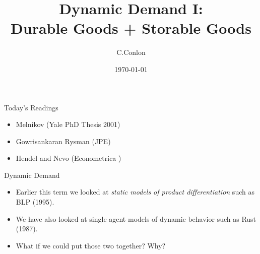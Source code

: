 \def\beamerclassoptions{[xcolor=pdftex,dvipsnames,table,mathserif,aspectratio=169]}


\usepackage[english]{babel}
\usepackage{pgf,pgfarrows,pgfnodes,pgfautomata,pgfheaps}
\usepackage{amsmath,amssymb,setspace,centernot}
\usepackage[latin1]{inputenc}
\usepackage[T1]{fontenc}
\usepackage{relsize}
\usepackage{pdfpages}
\usepackage[absolute,overlay]{textpos} 



\title [Dynamic Demand I]{Dynamic Demand I:\\
 Durable Goods + Storable Goods}
\author{C.Conlon}
\date{\today}


\begin{frame}
\titlepage
\end{frame}

\begin{frame}{Today's Readings}
\begin{itemize}
\item Melnikov (Yale PhD Thesis 2001)
\item Gowrisankaran Rysman (JPE)
\item Hendel and Nevo (Econometrica )

\end{itemize}
\end{frame}


\begin{frame}{Dynamic Demand}
\begin{itemize}
\item Earlier this term we looked at \textit{static models of product differentiation} such as BLP (1995).
\item We have also looked at single agent models of dynamic behavior such as Rust (1987).
\item What if we could put those two together? Why?
\end{itemize}
\end{frame}


